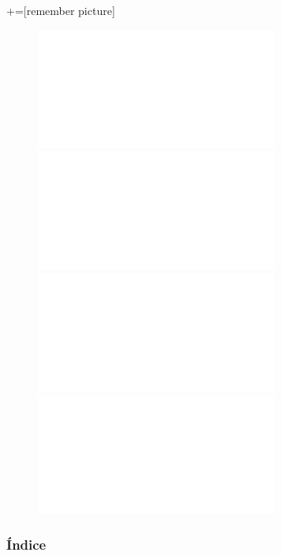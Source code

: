 \documentclass[9pt,xcolor=svgnames]{beamer}
\begin{document}
+=[remember picture]
\everymath{\displaystyle}


\begin{frame}
 \thispagestyle{empty}
 
 \begin{figure}[t]
  \centering
  \includegraphics<1>[scale=0.7]{../Imagenes/logo_1.pdf}
  \includegraphics<2>[scale=0.7]{../Imagenes/logo_2.pdf}
  \includegraphics<3>[scale=0.7]{../Imagenes/logo_3.pdf}
  \includegraphics<4>[scale=0.7]{../Imagenes/logo_4.pdf}
 \end{figure}
\end{frame}



\begin{frame}
 \titlepage
\end{frame}

\normalsize

\begin{frame}
 \frametitle{Índice} 
 \transboxin
 \tableofcontents
\end{frame}
  
\end{document}
